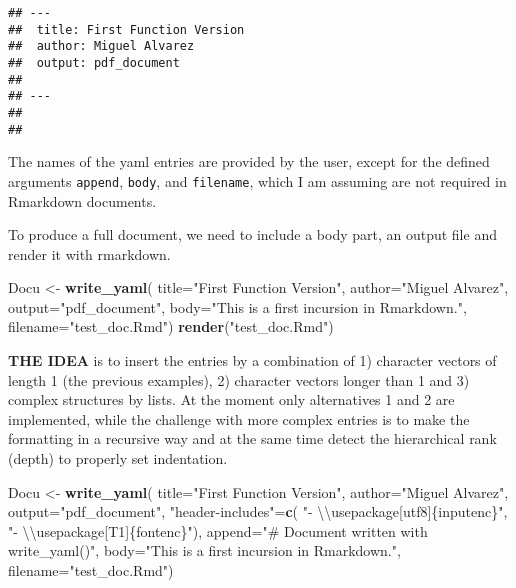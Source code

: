 \documentclass[
]{article}
\newenvironment{Shaded}{\begin{snugshade}}{\end{snugshade}}
\newcommand{\CharTok}[1]{\textcolor[rgb]{0.31,0.60,0.02}{#1}}
\newcommand{\DataTypeTok}[1]{\textcolor[rgb]{0.13,0.29,0.53}{#1}}
\newcommand{\KeywordTok}[1]{\textcolor[rgb]{0.13,0.29,0.53}{\textbf{#1}}}
\newcommand{\NormalTok}[1]{#1}
\newcommand{\StringTok}[1]{\textcolor[rgb]{0.31,0.60,0.02}{#1}}
\begin{document}
\begin{verbatim}
## ---
##  title: First Function Version
##  author: Miguel Alvarez
##  output: pdf_document
##  
## ---
## 
## 
\end{verbatim}

The names of the yaml entries are provided by the user, except for the
defined arguments \texttt{append}, \texttt{body}, and \texttt{filename},
which I am assuming are not required in Rmarkdown documents.

To produce a full document, we need to include a body part, an output
file and render it with rmarkdown.

\begin{Shaded}
\begin{Highlighting}[]
\NormalTok{Docu \textless{}{-}}\StringTok{ }\KeywordTok{write\_yaml}\NormalTok{(}
        \DataTypeTok{title=}\StringTok{"First Function Version"}\NormalTok{,}
        \DataTypeTok{author=}\StringTok{"Miguel Alvarez"}\NormalTok{,}
        \DataTypeTok{output=}\StringTok{"pdf\_document"}\NormalTok{,}
        \DataTypeTok{body=}\StringTok{"This is a first incursion in Rmarkdown."}\NormalTok{,}
        \DataTypeTok{filename=}\StringTok{"test\_doc.Rmd"}\NormalTok{)}
\KeywordTok{render}\NormalTok{(}\StringTok{"test\_doc.Rmd"}\NormalTok{)}
\end{Highlighting}
\end{Shaded}

\textbf{THE IDEA} is to insert the entries by a combination of 1)
character vectors of length 1 (the previous examples), 2) character
vectors longer than 1 and 3) complex structures by lists. At the moment
only alternatives 1 and 2 are implemented, while the challenge with more
complex entries is to make the formatting in a recursive way and at the
same time detect the hierarchical rank (depth) to properly set
indentation.

\begin{Shaded}
\begin{Highlighting}[]
\NormalTok{Docu \textless{}{-}}\StringTok{ }\KeywordTok{write\_yaml}\NormalTok{(}
        \DataTypeTok{title=}\StringTok{"First Function Version"}\NormalTok{,}
        \DataTypeTok{author=}\StringTok{"Miguel Alvarez"}\NormalTok{,}
        \DataTypeTok{output=}\StringTok{"pdf\_document"}\NormalTok{,}
        \StringTok{"header{-}includes"}\NormalTok{=}\KeywordTok{c}\NormalTok{(}
                \StringTok{"{-} }\CharTok{\textbackslash{}\textbackslash{}}\StringTok{usepackage[utf8]\{inputenc\}"}\NormalTok{,}
                \StringTok{"{-} }\CharTok{\textbackslash{}\textbackslash{}}\StringTok{usepackage[T1]\{fontenc\}"}\NormalTok{),}
        \DataTypeTok{append=}\StringTok{"\# Document written with \textquotesingle{}write\_yaml()\textquotesingle{}"}\NormalTok{,}
        \DataTypeTok{body=}\StringTok{"This is a first incursion in Rmarkdown."}\NormalTok{,}
        \DataTypeTok{filename=}\StringTok{"test\_doc.Rmd"}\NormalTok{)}
\end{Highlighting}
\end{Shaded}
\end{document}
